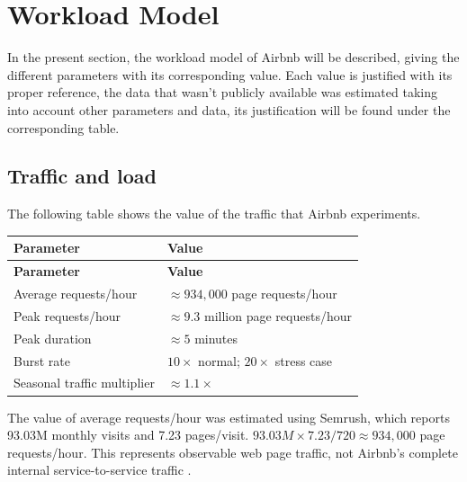 \section{Workload Model}

In the present section, the workload model of Airbnb will be described, giving the different parameters with 
its corresponding value. Each value is justified with its proper reference, the data that wasn't publicly available
was estimated taking into account other parameters and data, its justification will be found under the corresponding
table.

\subsection{Traffic and load}

The following table shows the value of the traffic that Airbnb experiments.

\begin{longtable}{|p{}|p{}|}
    \hline
    \textbf{Parameter} & 
    \textbf{Value} \\ 
    \hline
    \endfirsthead%

    \hline
    \textbf{Parameter} & 
    \textbf{Value} \\ 
    \hline
    \endhead%

    Average requests/hour &
    $\approx 934{,}000$ page requests/hour \cite{semrush_airbnb_2026}\\
    \hline

    Peak requests/hour &
    $\approx 9.3$ million page requests/hour \cite{semrush_airbnb_2026, airbnb_engineering_traffic_spikes} \\
    \hline

    Peak duration &
    $\approx 5$ minutes \cite{airbnb_engineering_traffic_spikes} \\
    \hline

    Burst rate &
    $10\times$ normal; $20\times$ stress case \cite{airbnb_engineering_traffic_spikes} \\
    \hline

    Seasonal traffic multiplier &
    $\approx 1.1\times$ \cite{airbnb_10k_2025} \\
    \hline

\end{longtable}

The value of average requests/hour was estimated using Semrush, which reports 93.03M monthly visits and 7.23 pages/visit. 
$93.03M \times 7.23 / 720 \approx 934{,}000$ page requests/hour. This represents observable web page 
traffic, not Airbnb's complete internal service-to-service traffic \cite{semrush_airbnb_2026}.

